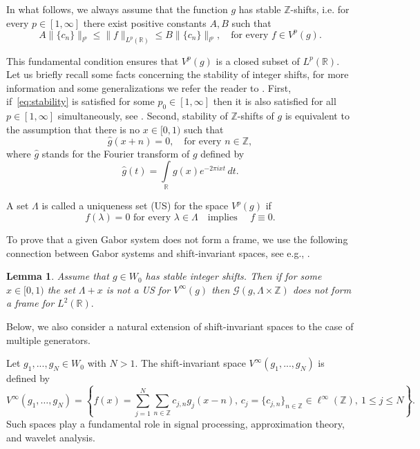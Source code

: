 \documentclass[12pt]{amsart}
\numberwithin{equation}{section}
\newtheorem{lemma}[theorem]{Lemma}
\newcommand{\R}{{\mathbb R}} \newcommand{\Q}{{\mathbb Q}} \newcommand{\Z}{{\mathbb Z}} \newcommand{\N}{{\mathbb N}}
\begin{document}
In what follows, we always assume that the function $g$ has stable $\Z$-shifts, i.e. 
for every $p \in [1, \infty]$ there exist positive constants $A,B$ such that 
\begin{equation}\label{eq:stability}
  A\|\{c_n\}\|_{l^p} \leq \|f\|_{L^p(\R)} \leq B\|\{c_n\}\|_{l^p}, \quad \text{for every } f\in V^p(g).  
\end{equation}

This fundamental condition ensures that $V^p(g)$ is a closed subset of $L^p(\R).$ Let us briefly recall some facts concerning the stability of integer shifts, for more information and some generalizations we refer the reader to \cite{MR3336091, Jia1991, MR1850960, MR4950401}.
First, if~\eqref{eq:stability} is satisfied for some $p_0 \in [1, \infty]$ then it is also satisfied for all $p \in [1, \infty]$ simultaneously, see \cite{MR3336091}.
Second, stability of $\Z$-shifts of $g$ is equivalent to the assumption that there is no $x\in[0,1)$ such that
\begin{equation}\label{eq:stability_fourier}
    \hat{g}(x+n) = 0, \quad\text{for every } n\in \Z,
\end{equation}
where $\hat{g}$ stands for the Fourier transform of $g$ defined by
$$
\hat{g}(t) = \int\limits_{\R} g(x) e^{-2\pi i xt}\, dt.
$$

A set $\Lambda$ is called a uniqueness set (US) for the space $V^p(g)$ if 
$$
f(\lambda) = 0 \,\, \text{for every } \lambda \in \Lambda \quad \text{implies }\quad f\equiv 0.
$$

To prove that a given Gabor system does not form a frame, we use the following connection between Gabor systems and shift-invariant spaces, see e.g., \cite{MR4047939}.

\begin{lemma}\label{lem:gabor_frames_uniquenes_sets}
    Assume that $g \in W_0$ has stable integer shifts. Then if for some $x\in[0,1)$ the set $\Lambda +x$ is not a US for $V^\infty(g)$ then $\mathcal{G}(g, \Lambda \times \Z)$ does not form a frame for $L^2(\R).$
\end{lemma}

Below, we also consider a natural extension of shift-invariant spaces to the case of multiple generators.

Let $g_1,...,g_N \in W_0$ with $ N>1.$ The shift-invariant space $V^\infty(g_1,...,g_N)$  is defined by
$$
V^\infty(g_1,\dots,g_N)
=
\left\{
 f(x)=\sum_{j=1}^N\sum_{n\in\mathbb Z} c_{j,n}g_j(x-n),
\, c_j=\{c_{j,n}\}_{n\in\mathbb Z}\in \ell^\infty(\mathbb Z),
\ 1\leq j\leq N
\right\}.
$$
Such spaces play a fundamental role in signal processing, approximation theory, and wavelet analysis.  
\end{document}
